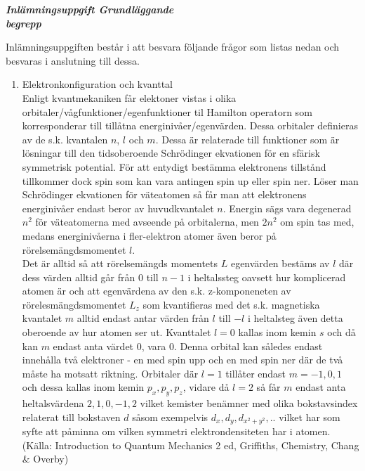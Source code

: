 \documentclass[./chem_exercises.tex]{subfiles}
\begin{document}



\textit{\textbf{Inlämningsuppgift Grundläggande\\ begrepp}}

Inlämningsuppgiften består i att besvara följande frågor som listas nedan och besvaras i anslutning till
dessa.
\begin{enumerate}

\item Elektronkonfiguration och kvanttal\\

 Enligt kvantmekaniken får elektoner vistas i olika orbitaler/vågfunktioner/egenfunktioner til Hamilton operatorn som korresponderar till tillåtna energinivåer/egenvärden. Dessa orbitaler definieras av de s.k. kvantalen
$n$, $l$ och $m$. Dessa är relaterade till funktioner som är lösningar till den tidsoberoende Schrödinger ekvationen
för en sfärisk symmetrisk potential.
För att entydigt bestämma elektronens tillstånd tillkommer dock spin som kan vara antingen spin up eller spin ner.
Löser man Schrödinger ekvationen för väteatomen så får man att elektronens energinivåer endast beror
av huvudkvantalet $n$. Energin sägs vara degenerad $n^2$ för väteatomerna med avseende på orbitalerna, men $2n^2$ om spin tas med, medans energinivåerna i fler-elektron atomer
även beror på rörelsemängdsmomentet $l$.\\
Det är alltid så att rörelsemängds momentets $L$ egenvärden bestäms av $l$ där dess värden alltid går från 0 till $n-1$
i heltalssteg oavsett hur komplicerad atomen är och att egenvärdena av  den s.k. z-komponeneten av rörelesmängdsmomentet $L_z$ som kvantifieras med det s.k. magnetiska kvantalet $m$ alltid endast antar värden
från $l$ till $-l$ i heltalsteg även detta oberoende av hur atomen ser ut.
Kvanttalet $l=0$ kallas inom kemin $s$ och då kan $m$ endast anta värdet 0,
vara 0. Denna orbital kan således endast innehålla två elektroner - en med spin upp och en med spin ner där de två måste ha motsatt riktning.
Orbitaler där $l=1$ tillåter endast $m=-1,0,1$ och dessa kallas inom kemin $p_x, p_y, p_z$, vidare då $l=2$ så får $m$ endast anta heltalsvärdena $2,1,0,-1,2$
vilket kemister benämner med olika bokstavsindex relaterat till bokstaven $d$ såsom exempelvis 
$d_x, d_y,d_{x^2+y^2},..$ vilket har som syfte att påminna om vilken symmetri elektrondensiteten har i atomen.
(Källa: Introduction to Quantum Mechanics 2 ed, Griffiths, Chemistry, Chang \& Overby)


\end{enumerate}
\end{document}
